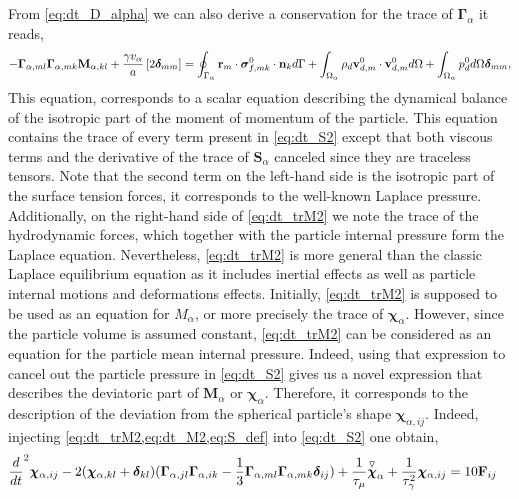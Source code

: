 From \ref{eq:dt_D_alpha} we can also derive a conservation for the trace of $\bm\Gamma_\alpha$ it reads, 
\begin{equation}
    -  \bm\Gamma_{\alpha,ml}\bm\Gamma_{\alpha,mk} \textbf{M}_{\alpha,kl}  
    + \frac{\gamma v_\alpha }{a} 
    \left[
    2\bm\delta_{mm} 
    \right]
    = 
    \intS{\textbf{r}_m\cdot\bm\sigma_{f,mk}^0\cdot \textbf{n}_k} 
    + \intO{\rho_d \textbf{v}_{d,m}^0\cdot \textbf{v}_{d,m}^0}
    + \intO{p_d^0} \bm\delta_{mm},
    \label{eq:dt_trM2}
\end{equation}
This equation, corresponds to a scalar equation describing the dynamical balance of the isotropic part of the moment of momentum of the particle. 
This equation contains the trace of every term present in \ref{eq:dt_S2} except that both viscous terms and the derivative of the trace of $\textbf{S}_\alpha$ canceled since they are traceless tensors. 
Note that the second term on the left-hand side is the isotropic part of the surface tension forces, it corresponds to the well-known Laplace pressure. 
Additionally, on the right-hand side of \ref{eq:dt_trM2} we note the trace of the hydrodynamic forces, which together with the particle internal pressure form the Laplace equation. 
Nevertheless, \ref{eq:dt_trM2} is more general than the classic Laplace equilibrium equation as it includes inertial effects as well as particle internal motions and deformations effects.  
Initially, \ref{eq:dt_trM2} is supposed to be used as an equation for $M_\alpha$, or more precisely the trace of $\bm\chi_\alpha$.
However, since the particle volume is assumed constant, \ref{eq:dt_trM2} can be considered as an equation for the particle mean internal pressure. 
Indeed, using that expression to cancel out the particle pressure in \ref{eq:dt_S2} gives us a novel expression that describes the deviatoric part of $\textbf{M}_\alpha$ or $\bm\chi_\alpha$.
Therefore, it corresponds to the description of the deviation from the spherical particle's shape $\bm\chi_{\alpha,ij}$. 
Indeed, injecting \ref{eq:dt_trM2,eq:dt_M2,eq:S_def} into  \ref{eq:dt_S2} one obtain, 
\begin{align}
        \ddt^2 \bm\chi_{\alpha,ij}
        - 2(\bm\chi_{\alpha,kl} + \bm\delta_{kl})
        (\bm\Gamma_{\alpha,jl}\bm\Gamma_{\alpha,ik}  
        - \frac{1}{3}
        \bm\Gamma_{\alpha,ml}\bm\Gamma_{\alpha,mk}  
        \bm\delta_{ij}
        )
    &+ 
    \frac{1}{\tau_\mu}
    \overset{ \triangledown  }{\bm\chi}_\alpha
    +
    \frac{1}{\tau_\gamma^2}
    \bm\chi_{\alpha,ij}
    = 
    10 \textbf{F}_{ij}
    \label{eq:dev}
\end{align}
